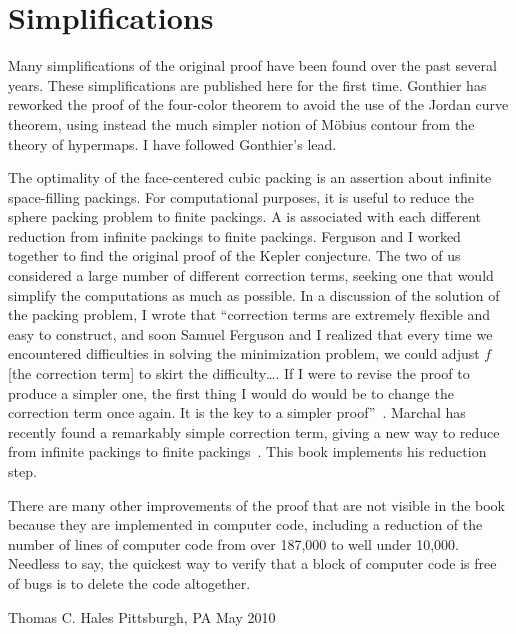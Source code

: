 \section*{Simplifications}

Many simplifications of the original proof have been found over the
past several years.  These simplifications are published here for the
first time.  Gonthier has reworked the proof of the four-color
theorem to avoid the use of the Jordan curve theorem, using instead
the much simpler notion of M\"obius contour from the theory of
hypermaps.  I have followed Gonthier's lead.

The optimality of the face-centered cubic packing is an assertion
about infinite space-filling packings.  For computational purposes, it is
useful to reduce the sphere packing problem to finite packings.  A
 is associated with each different reduction from
infinite packings to finite packings.  Ferguson and I worked together to
find the original proof of the Kepler conjecture.  The two of us considered a
large number of different correction terms, seeking one that
would simplify the computations as much as possible.  In a discussion
of the solution of the packing problem, I wrote that ``correction
terms are extremely flexible and easy to construct, and soon Samuel
Ferguson and I realized that every time we encountered difficulties in
solving the minimization problem, we could adjust $f$ [the correction
term] to skirt the difficulty\dots.  If I were to revise the proof
to produce a simpler one, the first thing I would do would be to
change the correction term once again.  It is the key to a simpler
proof''~\cite{Hales:2000:cannonballs}.  Marchal has recently found a remarkably simple 
correction term, giving a new way  to  reduce from infinite packings
to finite packings~\cite{marchal:2009}.  This book implements his reduction step.

There are many other improvements of the proof that are not visible in
the book because they are implemented in computer code, including
a reduction of  the number of lines of computer code from over 187,000
to well under 10,000.  Needless to say, the quickest way to verify that a block
 of computer code is free of bugs is to delete the code altogether.




\bigskip
\hbox{}



\bigskip
\hbox{}

{
\parindent=0pt
\obeylines

Thomas C. Hales
Pittsburgh, PA
May 2010

}







